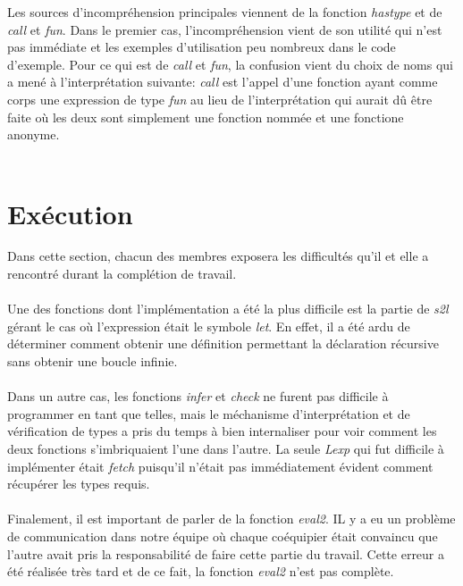 \documentclass{article}
\begin{document}
Les sources d'incompréhension principales viennent de la fonction \textit{hastype} et de \textit{call} et \textit{fun}. Dans le premier cas, l'incompréhension vient de son utilité qui n'est pas immédiate et les exemples d'utilisation peu nombreux dans le code d'exemple. Pour ce qui est de \textit{call} et \textit{fun}, la confusion vient du choix de noms qui a mené à l'interprétation suivante: \textit{call} est l'appel d'une fonction ayant comme corps une expression de type \textit{fun} au lieu de l'interprétation qui aurait dû être faite où les deux sont simplement une fonction nommée et une fonctione anonyme.\\\\

\section{Exécution}
Dans cette section, chacun des membres exposera les difficultés qu'il et elle a rencontré durant la complétion de travail.\\\\

Une des fonctions dont l'implémentation a été la plus difficile est la partie de \textit{s2l} gérant le cas où l'expression était le symbole \textit{let}. En effet, il a été ardu de déterminer comment obtenir une définition permettant la déclaration récursive sans obtenir une boucle infinie. \\\\

Dans un autre cas, les fonctions \textit{infer} et \textit{check} ne furent pas difficile à programmer en tant que telles, mais le méchanisme d'interprétation et de vérification de types a pris du temps à bien internaliser pour voir comment les deux fonctions s'imbriquaient l'une dans l'autre. La seule \textit{Lexp} qui fut difficile à implémenter était \textit{fetch} puisqu'il n'était pas immédiatement évident comment récupérer les types requis. \\\\

Finalement, il est important de parler de la fonction \textit{eval2}. IL y a eu un problème de communication dans notre équipe où chaque coéquipier était convaincu que l'autre avait pris la responsabilité de faire cette partie du travail. Cette erreur a été réalisée très tard et de ce fait, la fonction \textit{eval2} n'est pas complète.\\\\
\end{document}
